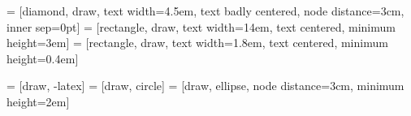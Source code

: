 \documentclass{article}
\begin{document}
\pagestyle{empty}
 = [diamond, draw, text width=4.5em, text badly centered, node distance=3cm, inner sep=0pt]
 = [rectangle, draw,  text width=14em, text centered,  minimum height=3em]
 = [rectangle, draw,  text width=1.8em, text centered,  minimum height=0.4em]

 = [draw, -latex]
 = [draw, circle]
 = [draw, ellipse, node distance=3cm,
    minimum height=2em]
    
    
    
\end{document}
